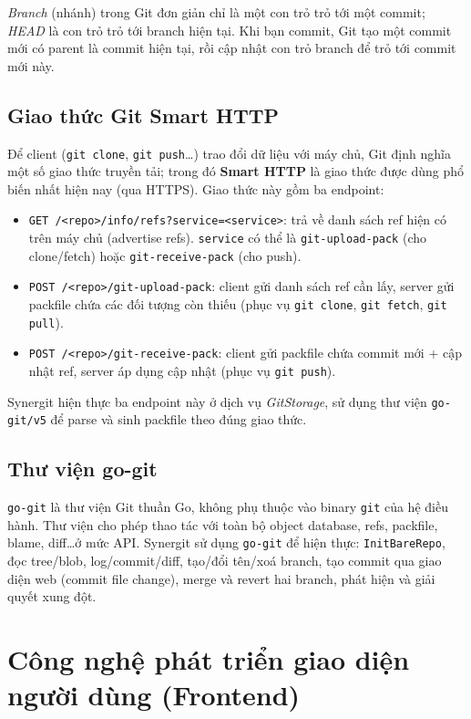 \textit{Branch} (nhánh) trong Git đơn giản chỉ là một con trỏ trỏ tới một commit; \textit{HEAD} là con trỏ trỏ tới branch hiện tại. Khi bạn commit, Git tạo một commit mới có parent là commit hiện tại, rồi cập nhật con trỏ branch để trỏ tới commit mới này.

\subsection{Giao thức Git Smart HTTP}
Để client (\texttt{git clone}, \texttt{git push}\ldots) trao đổi dữ liệu với máy chủ, Git định nghĩa một số giao thức truyền tải; trong đó \textbf{Smart HTTP} là giao thức được dùng phổ biến nhất hiện nay (qua HTTPS). Giao thức này gồm ba endpoint:

\begin{itemize}
\item \texttt{GET /<repo>/info/refs?service=<service>}: trả về danh sách ref hiện có trên máy chủ (advertise refs). \texttt{service} có thể là \texttt{git-upload-pack} (cho clone/fetch) hoặc \texttt{git-receive-pack} (cho push).
\item \texttt{POST /<repo>/git-upload-pack}: client gửi danh sách ref cần lấy, server gửi packfile chứa các đối tượng còn thiếu (phục vụ \texttt{git clone}, \texttt{git fetch}, \texttt{git pull}).
\item \texttt{POST /<repo>/git-receive-pack}: client gửi packfile chứa commit mới + cập nhật ref, server áp dụng cập nhật (phục vụ \texttt{git push}).
\end{itemize}

Synergit hiện thực ba endpoint này ở dịch vụ \textit{GitStorage}, sử dụng thư viện \texttt{go-git/v5} để parse và sinh packfile theo đúng giao thức.

\subsection{Thư viện go-git}
\texttt{go-git} là thư viện Git thuần Go, không phụ thuộc vào binary \texttt{git} của hệ điều hành. Thư viện cho phép thao tác với toàn bộ object database, refs, packfile, blame, diff\ldots ở mức API. Synergit sử dụng \texttt{go-git} để hiện thực: \texttt{InitBareRepo}, đọc tree/blob, log/commit/diff, tạo/đổi tên/xoá branch, tạo commit qua giao diện web (commit file change), merge và revert hai branch, phát hiện và giải quyết xung đột.

\section{Công nghệ phát triển giao diện người dùng (Frontend)}

